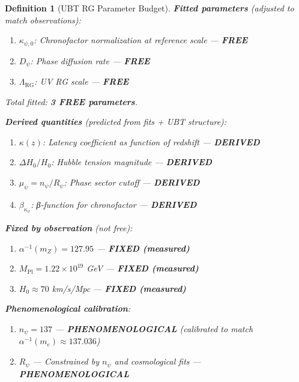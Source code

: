 \documentclass[12pt]{article}
\newtheorem{definition}{Definition}[section]
\newcommand{\RG}{\text{RG}}
\begin{document}
\begin{definition}[UBT RG Parameter Budget]
\textbf{Fitted parameters} (adjusted to match observations):
\begin{enumerate}
    \item $\kappa_{\psi,0}$: Chronofactor normalization at reference scale — \textbf{FREE}
    \item $D_\psi$: Phase diffusion rate — \textbf{FREE}
    \item $\Lambda_{\RG}$: UV RG scale — \textbf{FREE}
\end{enumerate}
Total fitted: \textbf{3 FREE parameters}.

\textbf{Derived quantities} (predicted from fits + UBT structure):
\begin{enumerate}
    \item $\kappa(z)$: Latency coefficient as function of redshift — \textbf{DERIVED}
    \item $\Delta H_0 / H_0$: Hubble tension magnitude — \textbf{DERIVED}
    \item $\mu_\psi = n_\psi / R_\psi$: Phase sector cutoff — \textbf{DERIVED}
    \item $\beta_{\kappa_\psi}$: β-function for chronofactor — \textbf{DERIVED}
\end{enumerate}

\textbf{Fixed by observation} (not free):
\begin{enumerate}
    \item $\alpha^{-1}(m_Z) = 127.95$ — \textbf{FIXED (measured)}
    \item $M_{\text{Pl}} = 1.22 \times 10^{19}$ GeV — \textbf{FIXED (measured)}
    \item $H_0 \approx 70$ km/s/Mpc — \textbf{FIXED (measured)}
\end{enumerate}

\textbf{Phenomenological calibration}:
\begin{enumerate}
    \item $n_\psi = 137$ — \textbf{PHENOMENOLOGICAL} (calibrated to match $\alpha^{-1}(m_e) \approx 137.036$)
    \item $R_\psi$ — Constrained by $n_\psi$ and cosmological fits — \textbf{PHENOMENOLOGICAL}
\end{enumerate}
\end{definition}
\end{document}
